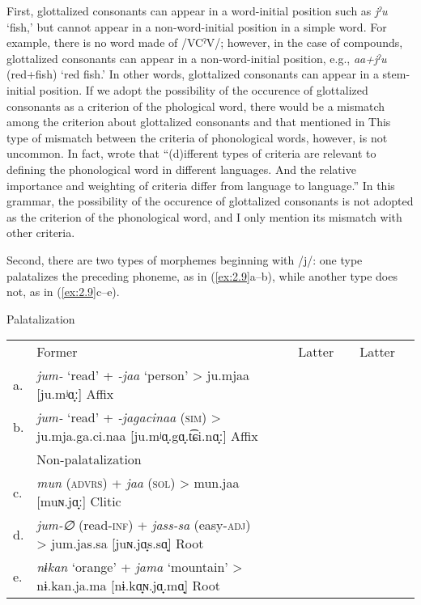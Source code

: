 First, glottalized consonants can appear in a word-initial position such as \textit{jˀu} ‘fish,’ but cannot appear in a non-word-initial position in a simple word. For example, there is no word made of /VCˀV/; however, in the case of compounds, glottalized consonants can appear in a non-word-initial position, e.g., \textit{aa+jˀu} (red+fish) ‘red fish.’ In other words, glottalized consonants can appear in a stem-initial position. If we adopt the possibility of the occurence of glottalized consonants as a criterion of the phological word, there would be a mismatch among the criterion about glottalized consonants and that mentioned in  This type of mismatch between the criteria of phonological words, however, is not uncommon. In fact, \citet[18]{DixonAikhenvald2002} wrote that “(d)ifferent types of criteria are relevant to defining the phonological word in different languages. And the relative importance and weighting of criteria differ from language to language.” In this grammar, the possibility of the occurence of glottalized consonants is not adopted as the criterion of the phonological word, and I only mention its mismatch with other criteria.

Second, there are two types of morphemes beginning with /j/: one type palatalizes the preceding phoneme, as in (\ref{ex:2.9}a--b), while another type does not, as in (\ref{ex:2.9}c--e).

\ea Palatalization\\\label{ex:2.9}
\begin{tabular}{lllllllll}
   &   \multicolumn{2}{l}{Former}  & &  \multicolumn{2}{l}{Latter}   & &   {Latter}\\
a. & {\itshape jum-}  {‘read’}  {+}  {\itshape {}-jaa}  {‘person’}  {>}  {ju.mjaa [ju.mʲɑ̟ː]}  {Affix}\\
b. & {\itshape jum-}  {‘read’}  {+}  {\itshape {}-jagacinaa}  {(\textsc{sim})}  {>}  {ju.mja.ga.ci.naa [ju.mʲɑ̟.gɑ̟.t͡ɕi.nɑ̟ː]}  {Affix}\medskip\\
   & \multicolumn{3}{l}{Non-palatalization} \\
c. & {\itshape mun}  {(\textsc{advrs})}  {+}  {\itshape jaa}  {(\textsc{sol})}  {>}  {mun.jaa [muɴ.jɑ̟ː]}  {Clitic}\\
d. & {\itshape jum-∅}  {(read-\textsc{inf})}  {+}  {\itshape jass-sa}  {(easy-\textsc{adj})}  {>}  {jum.jas.sa [juɴ.jɑ̟s.sɑ̟]}  {Root}\\
e. & {\itshape nɨkan}  {‘orange’}  {+}  {\itshape jama}  {‘mountain’}  {>}  {nɨ.kan.ja.ma [nɨ.kɑ̟ɴ.jɑ̟.mɑ̟]}  {Root}\\
\end{tabular}
\z

